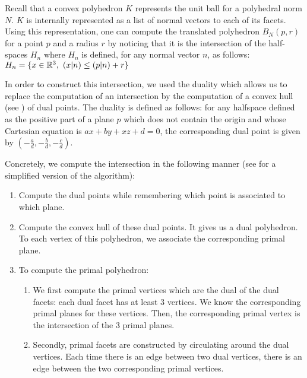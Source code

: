 Recall that a convex polyhedron $ K $ represents the unit ball for a polyhedral
norm $ N $. $ K $ is internally represented as a list of normal vectors to each
of its facets. Using this representation, one can compute the translated
polyhedron $ B_N(p, r) $ for a point $ p $ and a radius $ r $ by noticing that
it is the intersection of the half-spaces $ H_n $ where $ H_n $ is defined, for
any normal vector $ n $, as follows: $ H_n = \{ x \in \mathbb{R}^3,~ (x | n) \leq (p |
n) + r \} $

In order to construct this intersection, we used the duality which allows us to
replace the computation of an intersection by the computation of a convex hull
(see \cite{preparata1979finding}) of dual points. The duality is defined as
follows: for any halfspace defined as the positive part of a plane $ p $ which
does not contain the origin and whose Cartesian equation is $ ax + by + xz + d =
0 $, the corresponding dual point is given by $ (-\frac{a}{d}, -\frac{b}{d},
-\frac{c}{d}) $.

Concretely, we compute the intersection in the following manner (see
 for a simplified version of the
algorithm):
\begin{enumerate}
    \item Compute the dual points while remembering which point is associated to
        which plane.
    \item Compute the convex hull of these dual points. It gives us a dual
        polyhedron. To each vertex of this polyhedron, we associate the
        corresponding primal plane.
    \item To compute the primal polyhedron:
        \begin{enumerate}
            \item We first compute the primal vertices which are the dual of the
                dual facets: each dual facet has at least 3 vertices. We know
                the corresponding primal planes for these vertices.  Then, the
                corresponding primal vertex is the intersection of the 3 primal
                planes.
            \item Secondly, primal facets are constructed by circulating
                around the dual vertices. Each time there is an edge between two
                dual vertices, there is an edge between the two corresponding
                primal vertices.
        \end{enumerate}
\end{enumerate}

